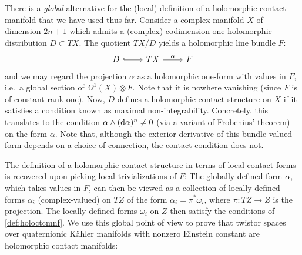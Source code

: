 There is a \emph{global} alternative for the (local) definition of a holomorphic contact manifold that we have used thus far. Consider a complex manifold $X$ of dimension $2n+1$ which admits a (complex) codimension one holomorphic distribution $D\subset TX$. The quotient $TX/D$ yields a holomorphic line bundle $F$:
\begin{equation*}
	\begin{tikzcd}
		D\ar[r,hook] & TX \ar[r,"\alpha"] & F
	\end{tikzcd}
\end{equation*}
and we may regard the projection $\alpha$ as a holomorphic one-form with values in $F$, i.e.~a global section of $\Omega^1(X)\otimes F$. Note that it is nowhere vanishing (since $F$ is of constant rank one). Now, $D$ defines a holomorphic contact structure on $X$ if it satisfies a condition known as maximal non-integrability. Concretely, this translates to the condition $\alpha\wedge (\mathrm{d} \alpha)^n\neq 0$ (via a variant of Frobenius' theorem) on the form $\alpha$. Note that, although the exterior derivative of this bundle-valued form depends on a choice of connection, the contact condition does not.

The definition of a holomorphic contact structure in terms of local contact forms is recovered upon picking local trivializations of $F$: The globally defined form $\alpha$, which takes values in $F$, can then be viewed as a collection of locally defined forms $\alpha_i$ (complex-valued) on $TZ$ of the form $\alpha_i=\pi^*\omega_i$, where $\pi:TZ\to Z$ is the projection. The locally defined forms $\omega_i$ on $Z$ then satisfy the conditions of \cref{def:holoctcmnf}. We use this global point of view to prove that twistor spaces over quaternionic K\"ahler manifolds with nonzero Einstein constant are holomorphic contact manifolds:

